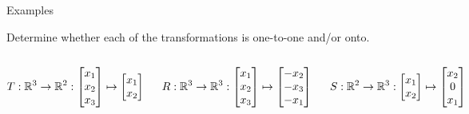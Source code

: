 \documentclass[xcolor=dvipsnames,aspectratio=169,t]{beamer}
\begin{document}
\begin{frame}{Examples}

Determine whether each of the transformations is one-to-one and/or onto. 

\begin{columns}[T]

\column{0.33\tw}

$\displaystyle T: \mathbb{R}^3 \to \mathbb{R}^2: \begin{bmatrix} x_1\\x_2\\x_3 \end{bmatrix} \mapsto \begin{bmatrix} x_1 \\ x_2 \end{bmatrix}$

\column{0.34\tw}

$\displaystyle R: \mathbb{R}^3 \to \mathbb{R}^3: \begin{bmatrix} x_1\\x_2\\x_3 \end{bmatrix} \mapsto \begin{bmatrix} -x_2 \\ -x_3 \\ -x_1 \end{bmatrix}$

\column{0.33\tw}

$\displaystyle S: \mathbb{R}^2 \to \mathbb{R}^3: \begin{bmatrix} x_1\\x_2 \end{bmatrix} \mapsto \begin{bmatrix} x_2 \\ 0 \\ x_1 \end{bmatrix}$

\end{columns}

\vspace{3in}

\end{frame}
\end{document}
